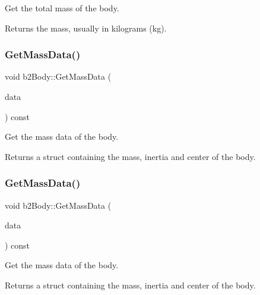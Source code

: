 Get the total mass of the body. \begin{DoxyReturn}{Returns}
the mass, usually in kilograms (kg). 
\end{DoxyReturn}
\mbox{\label{classb2Body_a5100927dbd39dd0addea79d5f323f3f1}} 
\subsubsection{\texorpdfstring{Get\+Mass\+Data()}{GetMassData()}\hspace{0.1cm}{\footnotesize\ttfamily [1/2]}}
{\footnotesize\ttfamily void b2\+Body\+::\+Get\+Mass\+Data (\begin{DoxyParamCaption}\item[{\hyperlink{structb2MassData}{b2\+Mass\+Data} $\ast$}]{data }\end{DoxyParamCaption}) const\hspace{0.3cm}{\ttfamily [inline]}}

Get the mass data of the body. \begin{DoxyReturn}{Returns}
a struct containing the mass, inertia and center of the body. 
\end{DoxyReturn}
\mbox{\label{classb2Body_a5100927dbd39dd0addea79d5f323f3f1}} 
\subsubsection{\texorpdfstring{Get\+Mass\+Data()}{GetMassData()}\hspace{0.1cm}{\footnotesize\ttfamily [2/2]}}
{\footnotesize\ttfamily void b2\+Body\+::\+Get\+Mass\+Data (\begin{DoxyParamCaption}\item[{\hyperlink{structb2MassData}{b2\+Mass\+Data} $\ast$}]{data }\end{DoxyParamCaption}) const}

Get the mass data of the body. \begin{DoxyReturn}{Returns}
a struct containing the mass, inertia and center of the body. 
\end{DoxyReturn}
\mbox{\label{classb2Body_a7944dc953ac0cb1e00b32bc61b50e70d}} 
